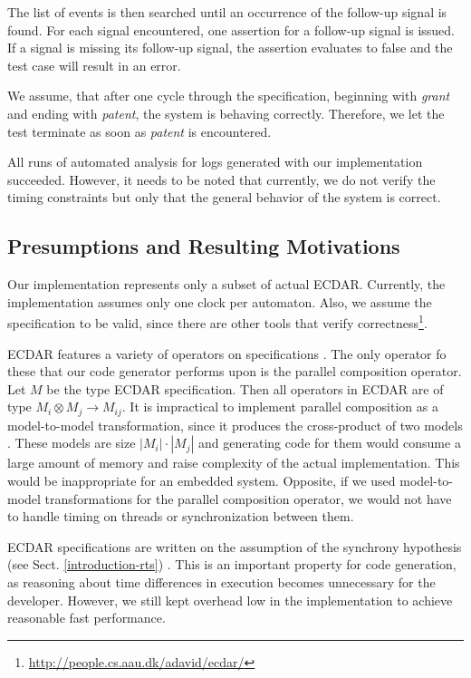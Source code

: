 The list of events is then searched until an occurrence of the follow-up signal
is found. For each signal encountered, one assertion for a follow-up signal is
issued. If a signal is missing its follow-up signal, the assertion evaluates to
false and the test case will result in an error.

We assume, that after one cycle through the specification, beginning with
\emph{grant} and ending with \emph{patent}, the system is behaving
correctly. Therefore, we let the test terminate as soon as \emph{patent} is
encountered.

All runs of automated analysis for logs generated with our implementation
succeeded. However, it needs to be noted that currently, we do not verify the
timing constraints but only that the general behavior of the system is correct.

\subsection{Presumptions and Resulting Motivations}
\label{implementation-presumptions}

Our implementation represents only a subset of actual ECDAR. Currently, the
implementation assumes only one clock per automaton. Also, we assume the
specification to be valid, since there are other tools that verify
correctness\footnote{\url{http://people.cs.aau.dk/adavid/ecdar/}}.

ECDAR features a variety of operators on specifications
\cite{david_compositional_2012}. The only operator fo these that our code
generator performs upon is the parallel composition operator. Let $M$ be the
type ECDAR specification. Then all operators in ECDAR are of type $M_{i}\otimes
M_{j}\rightarrow M_{ij}$. It is impractical to implement parallel composition as
a model-to-model transformation, since it produces the cross-product of two
models \cite{david_compositional_2012}. These models are size
$|M_{i}|\cdot|M_{j}|$ and generating code for them would consume a large amount
of memory and raise complexity of the actual implementation. This would be
inappropriate for an embedded system. Opposite, if we used model-to-model
transformations for the parallel composition operator, we would not have to
handle timing on threads or synchronization between them.

ECDAR specifications are written on the assumption of the synchrony hypothesis
(see Sect. \ref{introduction-rts}) \cite{david_compositional_2012}.  This is an
important property for code generation, as reasoning about time differences in
execution becomes unnecessary for the developer.  However, we still kept
overhead low in the implementation to achieve reasonable fast performance.



